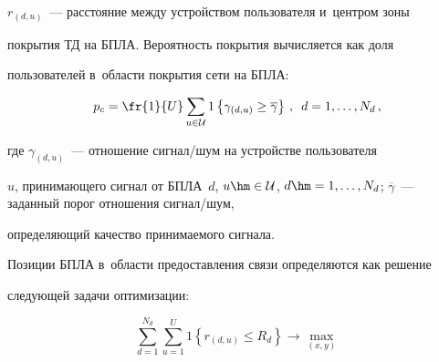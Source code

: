 $r_{(d,u)}$~--- расстояние между устройством пользователя и~центром зоны 


покрытия ТД на БПЛА. Вероятность покрытия вычисляется как доля 


пользователей в~области покрытия сети на БПЛА:





\vspace*{1pt}





\noindent


  \begin{equation*}


  p_c=\fr{1}{U}\sum\limits_{u\in \mathcal{U}} 1 \left\{ \gamma_{(d,u)}\geq 


\overline{\gamma}\right\}\,,\enskip d=1,\ldots , N_d\,,




  \end{equation*}


  


  \vspace*{-3pt}


  


  \noindent


где $\gamma_{(d,u)}$~--- отношение сигнал\!/\!шум на устройстве пользователя 


$u$, принимающего сигнал от БПЛА~$d$, $u\hm\in \mathcal{U}$, $d\hm=1, 


\ldots , N_d$; $\overline{\gamma}$~--- заданный порог отношения сигнал/шум, 


определяющий качество принимаемого сигнала. 





  Позиции БПЛА в~области предоставления связи определяются как решение 


следующей задачи оптимизации:





\pagebreak





\noindent


  \begin{equation*}


  \sum\limits^{N_d}_{d=1} \sum\limits^U_{u=1} 1\left\{ r_{(d,u)}\leq 


R_d\right\}\to \max_{(x,y)}




  \end{equation*}


